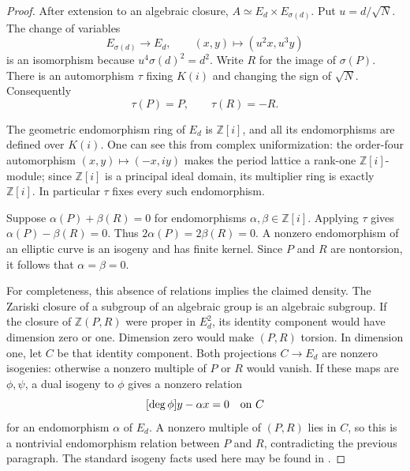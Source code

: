 \begin{proof}
After extension to an algebraic closure,
$A\simeq E_d\times E_{\sigma(d)}$.  Put $u=d/\sqrt N$.
The change of variables
\[
 E_{\sigma(d)}\longrightarrow E_d,
 \qquad (x,y)\longmapsto(u^2x,u^3y)
\]
is an isomorphism because
$u^4\sigma(d)^2=d^2$.  Write $R$ for the image of
$\sigma(P)$.  There is an automorphism $\tau$ fixing $K(i)$
and changing the sign of $\sqrt N$.  Consequently
\[
                            \tau(P)=P,\qquad\tau(R)=-R.
\]

The geometric endomorphism ring of $E_d$ is $\mathbb Z[i]$,
and all its endomorphisms are defined over $K(i)$.  One can see
this from complex uniformization: the order-four automorphism
$(x,y)\mapsto(-x,iy)$ makes the period lattice a rank-one
$\mathbb Z[i]$-module; since $\mathbb Z[i]$ is a principal ideal
domain, its multiplier ring is exactly $\mathbb Z[i]$.
In particular $\tau$ fixes every such endomorphism.

Suppose $\alpha(P)+\beta(R)=0$ for endomorphisms
$\alpha,\beta\in\mathbb Z[i]$.  Applying $\tau$ gives
$\alpha(P)-\beta(R)=0$.  Thus $2\alpha(P)=2\beta(R)=0$.
A nonzero endomorphism of an elliptic curve is an isogeny and
has finite kernel.  Since $P$ and $R$ are nontorsion, it follows
that $\alpha=\beta=0$.

For completeness, this absence of relations implies the claimed
density.  The Zariski closure of a subgroup of an algebraic group
is an algebraic subgroup.  If the closure of $\mathbb Z(P,R)$
were proper in $E_d^2$, its identity component would have
dimension zero or one.  Dimension zero would make $(P,R)$
torsion.  In dimension one, let $C$ be that identity component.
Both projections $C\to E_d$ are nonzero isogenies: otherwise
a nonzero multiple of $P$ or $R$ would vanish.  If these maps
are $\phi,\psi$, a dual isogeny to $\phi$ gives a nonzero
relation
\[
                       [\deg\phi]y-\alpha x=0
                       \quad\hbox{on }C
\]
for an endomorphism $\alpha$ of $E_d$.  A nonzero multiple of
$(P,R)$ lies in $C$, so this is a nontrivial endomorphism
relation between $P$ and $R$, contradicting the previous
paragraph.  The standard isogeny facts used here may be found
in \cite[Sections 8 and 12]{P3MilneAbelian}.
\end{proof}

